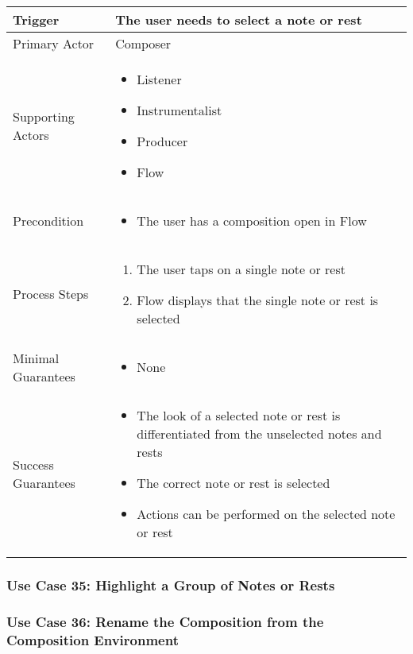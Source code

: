 \begin{tabularx}{\textwidth}{|X|X|}
\hline
Trigger & 
The user needs to select a note or rest \\
\hline
Primary Actor & 
Composer \\
\hline
Supporting Actors & 
\begin{itemize}
\item Listener
\item Instrumentalist
\item Producer
\item Flow
\end{itemize} \\
\hline
Precondition & 
\begin{itemize}
\item The user has a composition open in Flow
\end{itemize} \\
\hline
Process Steps & 
\begin{enumerate}
\item The user taps on a single note or rest
\item Flow displays that the single note or rest is selected
\end{enumerate} \\
\hline
Minimal Guarantees & 
\begin{itemize}
  \item None
\end{itemize} \\
\hline
Success Guarantees & 
\begin{itemize}
  \item The look of a selected note or rest is differentiated from the unselected notes and rests
  \item The correct note or rest is selected
  \item Actions can be performed on the selected note or rest
\end{itemize} \\
\hline
\end{tabularx}


\subsubsection{Use Case 35: Highlight a Group of Notes or Rests}


\subsubsection{Use Case 36: Rename the Composition from the Composition Environment}

